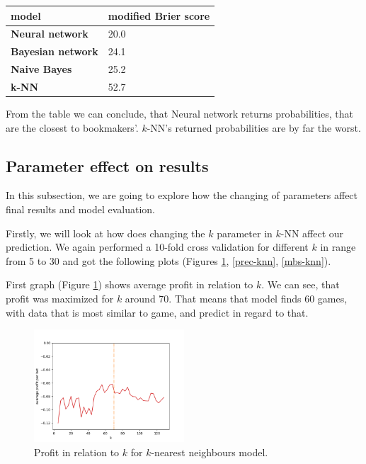 \documentclass[conference]{IEEEtran}
\begin{document}
\begin{table}[!ht]
    \centering
    \begin{tabular}{|l|l|}
    \hline
        \textbf{model} & modified Brier score \\ \hline
        \textbf{Neural network} & 20.0 \\ \hline
        \textbf{Bayesian network} & 24.1 \\ \hline
        \textbf{Naive Bayes} & 25.2 \\ \hline
        \textbf{k-NN} & 52.7 \\ \hline
    \end{tabular}
\end{table}

From the table we can conclude, that Neural network returns probabilities, that are the closest to 
bookmakers'. $k$-NN's returned probabilities are by far the worst.

\subsection{Parameter effect on results}

In this subsection, we are going to explore how the changing of parameters affect final results 
and model evaluation. 

Firstly, we will look at how does changing the $k$ parameter in $k$-NN affect our prediction. We again
performed a 10-fold cross validation for different $k$ in range from 5 to 30 and got the following 
plots (Figures \ref{profit-knn}, \ref{prec-knn}, \ref{mbs-knn}).

First graph (Figure \ref{profit-knn}) shows average profit in relation to $k$. We can see, that profit 
was maximized for $k$ around 70. That means that model finds 60 games, with data that is most
similar to game, and predict in regard to that.

\begin{figure}[!ht]
\includegraphics[width=0.5\textwidth]{profit_k_knn.png}
\caption{Profit in relation to $k$ for $k$-nearest neighbours model.}
\label{profit-knn}
\end{figure}
\end{document}
